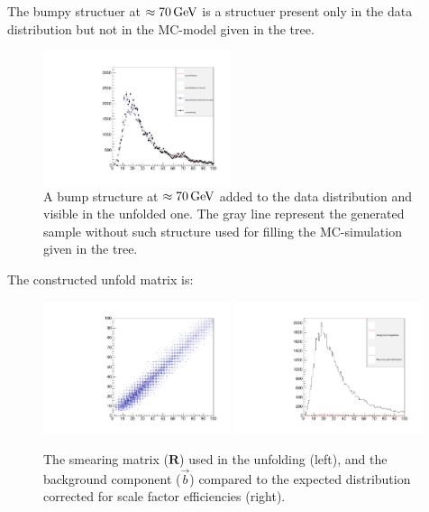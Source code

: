 \documentclass[a4paper,11pt]{article}
\begin{document}
The bumpy structuer at $\approx70\,\textup{GeV}$ is a structuer present only in the data distribution but not in the \gls{MC}-model given in the tree.
\begin{figure}[H]
	\centering
	\includegraphics[width=0.49\textwidth]{figs2/bump.pdf}
	\caption{ \label{fig:sol:bump} A bump structure at $\approx 70\,\textup{GeV}$ added to the data distribution and visible in the unfolded one. The gray line represent the generated sample without such structure used for filling the \gls{MC}-simulation given in the tree.
	}
\end{figure}

The constructed unfold matrix is:
\begin{figure}[H]
	\centering
	\includegraphics[width=0.49\textwidth]{figs2/matrix.pdf}
	\includegraphics[width=0.49\textwidth]{figs2/bkg.pdf}
	\caption{The smearing matrix ($\mathbf{R}$) used in the unfolding (left), and the background component ($\vec{b}$) compared to the expected distribution corrected for scale factor efficiencies (right).
	}
\end{figure}
\end{document}

